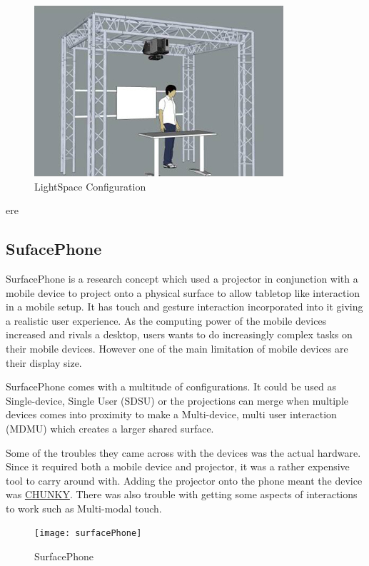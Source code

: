 \begin{figure}[H]
\includegraphics{images/LightSpace_configuration}

\protect\caption{LightSpace Configuration}
\end{figure}


ere


\subsection{SufacePhone}

SurfacePhone\cite{surfacephone} is a research concept which used
a projector in conjunction with a mobile device to project onto a
physical surface to allow tabletop like interaction in a mobile setup.
It has touch and gesture interaction incorporated into it giving a
realistic user experience. As the computing power of the mobile devices
increased and rivals a desktop, users wants to do increasingly complex
tasks on their mobile devices. However one of the main limitation
of mobile devices are their display size. 

SurfacePhone comes with a multitude of configurations. It could be
used as Single-device, Single User (SDSU) or the projections can merge
when multiple devices comes into proximity to make a Multi-device,
multi user interaction (MDMU) which creates a larger shared surface. 

Some of the troubles they came across with the devices was the actual
hardware. Since it required both a mobile device and projector, it
was a rather expensive tool to carry around with. Adding the projector
onto the phone meant the device was \uline{CHUNKY}. There was also
trouble with getting some aspects of interactions to work such as
Multi-modal touch.
\begin{figure}[H]
\texttt{[image: surfacePhone]}

\protect\caption{SurfacePhone}


\end{figure}

